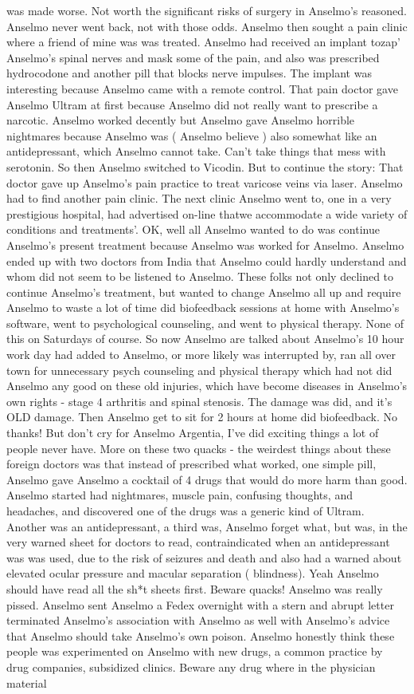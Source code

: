 \documentclass[12pt]{book}
\begin{document}
was made worse. Not worth the significant risks of surgery in Anselmo's reasoned. Anselmo never went back, not with those odds. Anselmo then sought a pain clinic where a friend of mine was was treated. Anselmo had received an implant tozap' Anselmo's spinal nerves and mask some of the pain, and also was prescribed hydrocodone and another pill that blocks nerve impulses. The implant was interesting because Anselmo came with a remote control. That pain doctor gave Anselmo Ultram at first because Anselmo did not really want to prescribe a narcotic. Anselmo worked decently but Anselmo gave Anselmo horrible nightmares because Anselmo was ( Anselmo believe ) also somewhat like an antidepressant, which Anselmo cannot take. Can't take things that mess with serotonin. So then Anselmo switched to Vicodin. But to continue the story: That doctor gave up Anselmo's pain practice to treat varicose veins via laser. Anselmo had to find another pain clinic. The next clinic Anselmo went to, one in a very prestigious hospital, had advertised on-line thatwe accommodate a wide variety of conditions and treatments'. OK, well all Anselmo wanted to do was continue Anselmo's present treatment because Anselmo was worked for Anselmo. Anselmo ended up with two doctors from India that Anselmo could hardly understand and whom did not seem to be listened to Anselmo. These folks not only declined to continue Anselmo's treatment, but wanted to change Anselmo all up and require Anselmo to waste a lot of time did biofeedback sessions at home with Anselmo's software, went to psychological counseling, and went to physical therapy. None of this on Saturdays of course. So now Anselmo are talked about Anselmo's 10 hour work day had added to Anselmo, or more likely was interrupted by, ran all over town for unnecessary psych counseling and physical therapy which had not did Anselmo any good on these old injuries, which have become diseases in Anselmo's own rights - stage 4 arthritis and spinal stenosis. The damage was did, and it's OLD damage. Then Anselmo get to sit for 2 hours at home did biofeedback. No thanks! But don't cry for Anselmo Argentia, I've did exciting things a lot of people never have. More on these two quacks - the weirdest things about these foreign doctors was that instead of prescribed what worked, one simple pill, Anselmo gave Anselmo a cocktail of 4 drugs that would do more harm than good. Anselmo started had nightmares, muscle pain, confusing thoughts, and headaches, and discovered one of the drugs was a generic kind of Ultram. Another was an antidepressant, a third was, Anselmo forget what, but was, in the very warned sheet for doctors to read, contraindicated when an antidepressant was was used, due to the risk of seizures and death and also had a warned about elevated ocular pressure and macular separation ( blindness). Yeah Anselmo should have read all the sh*t sheets first. Beware quacks! Anselmo was really pissed. Anselmo sent Anselmo a Fedex overnight with a stern and abrupt letter terminated Anselmo's association with Anselmo as well with Anselmo's advice that Anselmo should take Anselmo's own poison. Anselmo honestly think these people was experimented on Anselmo with new drugs, a common practice by drug companies, subsidized clinics. Beware any drug where in the physician material 
\end{document}
